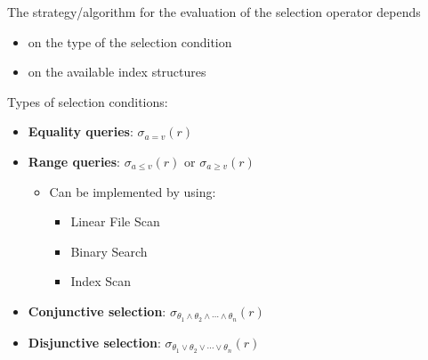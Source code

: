 The strategy/algorithm for the evaluation of the selection operator depends 
\begin{itemize}[label=\(\rhd\)]
    \item on the type of the selection condition
    \item on the available index structures
\end{itemize}

Types of selection conditions:
\begin{itemize}[label=\(\rhd\)]
    \item \textbf{Equality queries}: $\sigma_{a=v}(r)$
    \item \textbf{Range queries}: $\sigma_{a\leq v}(r) $ or $\sigma_{a\geq v}(r) $
    \begin{itemize}[label=\(\rhd\)]
        \item Can be implemented by using:
        \begin{itemize}[label=\(\rhd\)]
            \item Linear File Scan
            \item Binary Search
            \item Index Scan
        \end{itemize}
    \end{itemize}
    \item \textbf{Conjunctive selection}: $\sigma_{\theta_1 \land \theta_2 \land \cdots \land \theta_n}(r)$
    \item \textbf{Disjunctive selection}: $\sigma_{\theta_1 \lor \theta_2 \lor \cdots \lor \theta_n}(r)$
\end{itemize}



